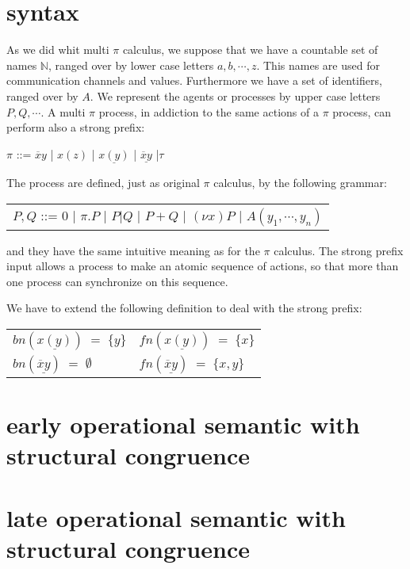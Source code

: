 
\section{syntax}

As we did whit multi $\pi$ calculus, we suppose that we have a countable set of names $\mathbb{N}$, ranged over by lower case letters $a,b, \cdots, z$. This names are used for communication channels and values. Furthermore we have a set of identifiers, ranged over by $A$. We represent the agents or processes by upper case letters $P,Q, \cdots $. A multi $\pi$ process, in addiction to the same actions of a $\pi$ process, can perform also a strong prefix:
\begin{center}
  $\pi$ ::= $\overline{x}y$ | $x(z)$ | $\underline{x(y)}$ | $\underline{\overline{x}y}$ |$\tau$ 
\end{center}
The process are defined, just as original $\pi$ calculus, by the following grammar:
\begin{center}
  \begin{tabular}{l}
    $P,Q$ ::= $0$ | $\pi.P$ | $P|Q$ | $P+Q$ | $(\nu x) P$ | $A(y_{1}, \cdots, y_{n})$
  \end{tabular}
\end{center}
and they have the same intuitive meaning as for the $\pi$ calculus. The strong prefix input allows a process to make an atomic sequence of actions, so that more than one process can synchronize on this sequence. 

We have to extend the following definition to deal with the strong prefix:
\begin{center}
  \begin{tabular}{ll}
	$bn(\underline{x(y)})\; =\; \{y\}$
      &
	$fn(\underline{x(y)})\; =\; \{x\}$
    \\
	$bn(\underline{\overline{x}y})\; =\; \emptyset$
      &
	$fn(\underline{\overline{x}y})\; =\; \{x,y\}$
    \\
  \end{tabular}
\end{center}


\section{early operational semantic with structural congruence}

\section{late operational semantic with structural congruence}

